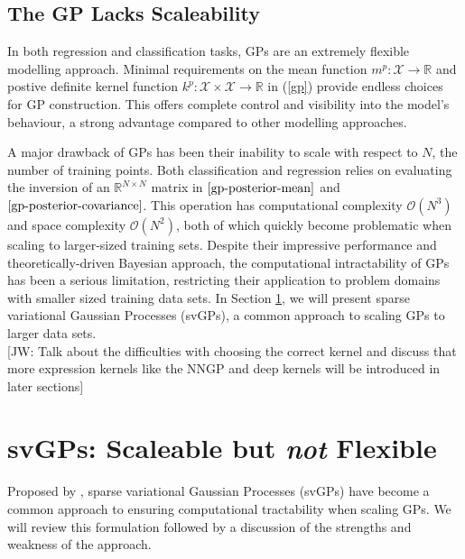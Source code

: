 \documentclass{article}
\newcommand{\jw}[1]{{\color{gray} [JW: #1]}}
\numberwithin{equation}{section}
\begin{document}
\subsection{The GP Lacks Scaleability}
In both regression and classification tasks, GPs are an extremely flexible modelling approach. Minimal requirements on the mean function $m^p: \mathcal{X} \rightarrow \mathbb{R}$ and postive definite kernel function $k^p: \mathcal{X} \times \mathcal{X} \rightarrow \mathbb{R}$ in (\ref{gp}) provide endless choices for GP construction. This offers complete control and visibility into the model's behaviour, a strong advantage compared to other modelling approaches. 

A major drawback of GPs has been their inability to scale with respect to $N$, the number of training points. Both classification and regression relies on evaluating the inversion of an $\mathbb{R}^{N \times N}$ matrix in $\ref{gp-posterior-mean}$ and $\ref{gp-posterior-covariance}$. This operation has computational complexity $\mathcal{O}(N^3)$ and space complexity $\mathcal{O}(N^2)$, both of which quickly become problematic when scaling to larger-sized training sets. Despite their impressive performance and theoretically-driven Bayesian approach, the computational intractability of GPs has been a serious limitation, restricting their application to problem domains with smaller sized training data sets. In Section \ref{section:the-svgp}, we will present sparse variational Gaussian Processes (svGPs), a common approach to scaling GPs to larger data sets.
\\\jw{Talk about the difficulties with choosing the correct kernel and discuss that more expression kernels like the NNGP and deep kernels will be introduced in later sections}

\newpage
\section{svGPs: Scaleable but \textit{not} Flexible}\label{section:the-svgp}
Proposed by \cite{titsias2009variational}, sparse variational Gaussian Processes (svGPs) have become a common approach to ensuring computational tractability when scaling GPs. We will review this formulation followed by a discussion of the strengths and weakness of the approach.
\end{document}
